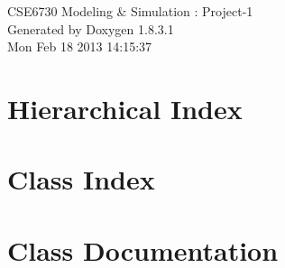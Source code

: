 \documentclass{book}
\begin{document}
\hypersetup{pageanchor=false,citecolor=blue}
\begin{titlepage}
\vspace*{7cm}
\begin{center}
{\Large C\-S\-E6730 Modeling \& Simulation \-: Project-\/1 }\\
\vspace*{1cm}
{\large Generated by Doxygen 1.8.3.1}\\
\vspace*{0.5cm}
{\small Mon Feb 18 2013 14:15:37}\\
\end{center}
\end{titlepage}
\clearemptydoublepage
{}
\tableofcontents
\clearemptydoublepage
{}
\hypersetup{pageanchor=true,citecolor=blue}
\chapter{Hierarchical Index}

\chapter{Class Index}

\chapter{Class Documentation}


















\printindex
\end{document}

